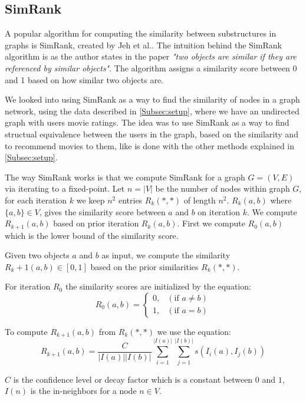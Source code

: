 \subsection{SimRank}
\label{Subsec:SimRank}
A popular algorithm for computing the similarity between substructures in graphs is SimRank, created by Jeh et al.\cite{10.1145/775047.775126}.
The intuition behind the SimRank algorithm is as the author states in the paper \emph{"two objects are similar if they are referenced by similar objects"}\cite{10.1145/775047.775126}. The algorithm assigns a similarity score between 0 and 1 based on how similar two objects are.


We looked into using SimRank as a way to find the similarity of nodes in a graph network, using the data described in \autoref{Subsec:setup}, where we have an undirected graph with users movie ratings. The idea was to use SimRank as a way to find structual equivalence between the users in the graph, based on the similarity and to recommend movies to them, like is done with the other methods explained in \autoref{Subsec:setup}.

The way SimRank works is that we compute SimRank for a graph $G = (V,E)$ via iterating to a fixed-point. 
Let $n = |V|$ be the number of nodes within graph $G$, for each iteration $k$ we keep $n^2$ entries $R_k(*,*)$ of length $n^2$.
$R_k(a,b)$ where $\{a,b\} \in V$, gives the similarity score between $a$ and $b$ on iteration $k$\cite{10.1145/775047.775126}.
We compute $R_{k+1}(a,b)$ based on prior iteration $R_k(a,b)$.
First we compute $R_0(a,b)$ which is the lower bound of the similarity score.

\begin{definition}[SimRank]\label{def:simrank} Given two objects $a$ and $b$ as input, we compute the similarity $R_k+1(a,b) \in [0,1]$ based on the prior similarities $R_k(*,*)$.

For iteration $R_0$ the similarity scores are initialized by the equation:
\begin{equation}\label{eq:lowerbound_sim_score}
R_0(a,b)= \begin{cases}
0, & (\text{if } a \neq b) \\

1 ,& (\text{if } a = b)
\end{cases}
\end{equation}

To compute $R_{k+1}(a,b)$ from $R_k(*,*)$ we use the equation:
\begin{equation}\label{eq:simrank_computation}
R_{k+1}(a,b)= \frac{C}{|I(a)||I(b)|}\sum^{|I(a)|}_{i=1}\sum^{|I(b)|}_{j=1}s(I_i(a),I_j(b))
\end{equation}

$C$ is the confidence level or decay factor which is a constant between $0$ and $1$, $I(n)$ is the in-neighbors for a node $n \in V$.

\end{definition}

